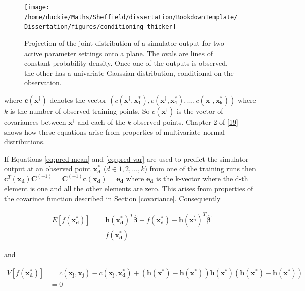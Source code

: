 \documentclass[
  12pt,
  a4paper,
  twoside]{book}
\begin{document}
\begin{figure}[H]

{\centering \texttt{[image: /home/duckie/Maths/Sheffield/dissertation/BookdownTemplate/Dissertation/figures/conditioning\_thicker]} 

}

\caption{Projection of the joint distribution of a simulator output for two active parameter settings onto a plane. The ovals are lines of constant probability density. Once one of the outputs is observed, the other has a univariate Gaussian distribution, conditional on the observation.}\label{fig:conditioning}
\end{figure}

where \(\mathbf{c}(\mathbf{x^\dagger})\) denotes the vector \(\left( c(\mathbf{x^\dagger}, \mathbf{x_1^*}),c(\mathbf{x^\dagger}, \mathbf{x_1^*}),...,c(\mathbf{x^\dagger}, \mathbf{x_k^*}) \right)\) where \(k\) is the number of observed training points. So \(c(\mathbf{x^\dagger})\) is the vector of covariances between \(\mathbf{x^\dagger}\) and each of the \(k\) observed points. Chapter 2 of \protect\hyperlink{ref-jeothesis}{{[}19{]}} shows how these equations arise from properties of multivariate normal distributions.

If Equations \eqref{eq:pred-mean} and \eqref{eq:pred-var} are used to predict the simulator output at an observed point \(\mathbf{x^*_d}\) (\(d \in 1,2,...,k\)) from one of the training runs then \(\mathbf{c}^T(\mathbf{x_d}) \mathbf{C}^{(-1)} = \mathbf{C}^{(-1)} \mathbf{c}(\mathbf{x_d}) = \mathbf{e_d}\) where \(\mathbf{e_d}\) is the k-vector where the d-th element is one and all the other elements are zero. This arises from properties of the covarince function described in Section \ref{covariance}. Consequently

\begin{align}
\label{eq:pred-design-1}
E[f(\mathbf{x^*_d})] &= \mathbf{h}(\mathbf{x^*_d})^T \hat{\mathbf{\beta}} + f(\mathbf{x^*_d}) - \mathbf{h}(\mathbf{x^^*_d})^T \hat{\mathbf{\beta}} \\ \nonumber
&= f(\mathbf{x^*_d})
\end{align}

and

\begin{align}
\label{eq:pred-design-2}
V[f(\mathbf{x^*_d})]  &= c(\mathbf{x_j}, \mathbf{x_j}) - c(\mathbf{x_j}, \mathbf{x^*_d}) + \left( \mathbf{h}(\mathbf{x^*}) - \mathbf{h}(\mathbf{x^*}) \right)\mathbf{h}(\mathbf{x^*})\left( \mathbf{h}(\mathbf{x^*}) - \mathbf{h}(\mathbf{x^*}) \right)\\ \nonumber
&= 0
\end{align}
\end{document}
